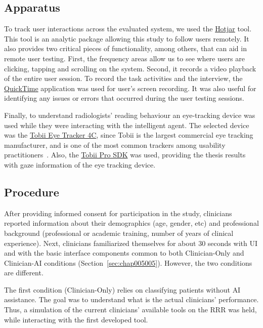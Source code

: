 \subsection{Apparatus}
\label{sec:app002005002}

To track user interactions across the evaluated system, we used the \hyperlink{https://www.hotjar.com/}{Hotjar} tool.
This tool is an analytic package allowing this study to follow users remotely.
It also provides two critical pieces of functionality, among others, that can aid in remote user testing.
First, the frequency areas allow us to see where users are clicking, tapping and scrolling on the system.
Second, it records a video playback of the entire user session.
To record the task activities and the interview, the \hyperlink{https://support.apple.com/downloads/quicktime}{QuickTime} application was used for user's screen recording.
It was also useful for identifying any issues or errors that occurred during the user testing sessions.

Finally, to understand radiologists' reading behaviour an eye-tracking device was used while they were interacting with the intelligent agent.
The selected device was the \hyperlink{https://gaming.tobii.com/product/tobii-eye-tracker-4c/}{Tobii Eye Tracker 4C}, since Tobii is the largest commercial eye tracking manufacturer, and is one of the most common trackers among usability practitioners~\cite{CALISTO2021102607}.
Also, the \hyperlink{https://www.tobiipro.com/product-listing/tobii-pro-sdk/}{Tobii Pro SDK} was used, providing the thesis results with gaze information of the eye tracking device.

\subsection{Procedure}
\label{sec:chap005005003}

After providing informed consent for participation in the study, clinicians reported information about their demographics (age, gender, etc) and professional background (professional or academic training, number of years of clinical experience).
Next, clinicians familiarized themselves for about 30 seconds with \ac{UI} and with the basic interface components common to both Clinician-Only and Clinician-AI conditions (Section~\ref{sec:chap005005}).
However, the two conditions are different.

The first condition (Clinician-Only) relies on classifying patients without \ac{AI} assistance.
The goal was to understand what is the actual clinicians' performance.
Thus, a simulation of the current clinicians' available tools on the \ac{RRR} was held, while interacting with the first developed tool.

